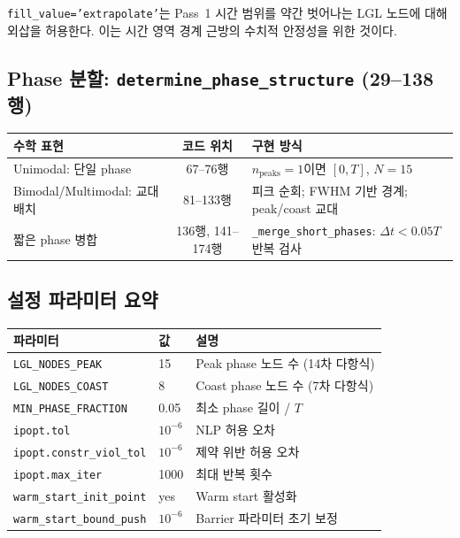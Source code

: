 \documentclass[11pt]{article}
\begin{document}
\texttt{fill\_value='extrapolate'}는 Pass~1 시간 범위를 약간 벗어나는 LGL 노드에 대해 외삽을 허용한다.
이는 시간 영역 경계 근방의 수치적 안정성을 위한 것이다.


\subsection{Phase 분할: \texttt{determine\_phase\_structure} (29--138행)}
\label{sec:phase_structure_impl}

\begin{table}[htbp]
\centering
\small
\begin{tabular}{p{4.5cm}cp{5.5cm}}
\toprule
수학 표현 & 코드 위치 & 구현 방식 \\
\midrule
Unimodal: 단일 phase & 67--76행 & $n_\text{peaks} = 1$이면 $[0, T]$, $N = 15$ \\
Bimodal/Multimodal: 교대 배치 & 81--133행 & 피크 순회; FWHM 기반 경계; peak/coast 교대 \\
짧은 phase 병합 & 136행, 141--174행 & \texttt{\_merge\_short\_phases}: $\Delta t < 0.05T$ 반복 검사 \\
\bottomrule
\end{tabular}
\end{table}


\subsection{설정 파라미터 요약}
\label{sec:parameters}

\begin{table}[htbp]
\centering
\begin{tabular}{llp{6cm}}
\toprule
파라미터 & 값 & 설명 \\
\midrule
\texttt{LGL\_NODES\_PEAK} & 15 & Peak phase 노드 수 (14차 다항식) \\
\texttt{LGL\_NODES\_COAST} & 8 & Coast phase 노드 수 (7차 다항식) \\
\texttt{MIN\_PHASE\_FRACTION} & 0.05 & 최소 phase 길이 / $T$ \\
\texttt{ipopt.tol} & $10^{-6}$ & NLP 허용 오차 \\
\texttt{ipopt.constr\_viol\_tol} & $10^{-6}$ & 제약 위반 허용 오차 \\
\texttt{ipopt.max\_iter} & 1000 & 최대 반복 횟수 \\
\texttt{warm\_start\_init\_point} & yes & Warm start 활성화 \\
\texttt{warm\_start\_bound\_push} & $10^{-6}$ & Barrier 파라미터 초기 보정 \\
\bottomrule
\end{tabular}
\end{table}
\end{document}
